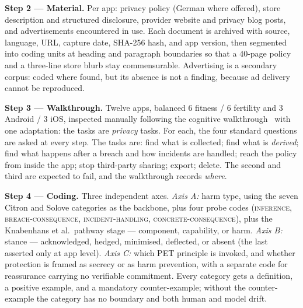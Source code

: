 \documentclass[10pt,a4paper]{article}
\begin{document}
\textbf{Step 2 --- Material.} Per app: privacy policy (German where offered),
store description and structured disclosure, provider website and privacy blog
posts, and advertisements encountered in use. Each document is archived with
source, language, URL, capture date, SHA-256 hash, and app version, then
segmented into coding units at heading and paragraph boundaries so that a
40-page policy and a three-line store blurb stay commensurable. Advertising is a
secondary corpus: coded where found, but its absence is not a finding, because
ad delivery cannot be reproduced.

\textbf{Step 3 --- Walkthrough.} Twelve apps, balanced 6 fitness / 6 fertility
and 3 Android / 3 iOS, inspected manually following the cognitive
walkthrough~\parencite{wharton1994cognitive} with one adaptation: the tasks are
\emph{privacy} tasks. For each, the four standard questions are asked at every
step. The tasks are: find what is collected; find what is \emph{derived}; find
what happens after a breach and how incidents are handled; reach the policy from
inside the app; stop third-party sharing; export; delete. The second and third
are expected to fail, and the walkthrough records \emph{where}.

\textbf{Step 4 --- Coding.} Three independent axes. \emph{Axis A:} harm type,
using the seven Citron and Solove categories as the backbone, plus four probe
codes (\textsc{inference}, \textsc{breach-consequence},
\textsc{incident-handling}, \textsc{concrete-consequence}), plus the
Knabenhans et al.\ pathway stage --- component, capability, or harm. \emph{Axis
B:} stance --- acknowledged, hedged, minimised, deflected, or absent (the last
asserted only at app level). \emph{Axis C:} which PET principle is invoked, and
whether protection is framed as secrecy or as harm prevention, with a separate
code for reassurance carrying no verifiable commitment. Every category gets a
definition, a positive example, and a mandatory counter-example; without the
counter-example the category has no boundary and both human and model drift.
\end{document}
